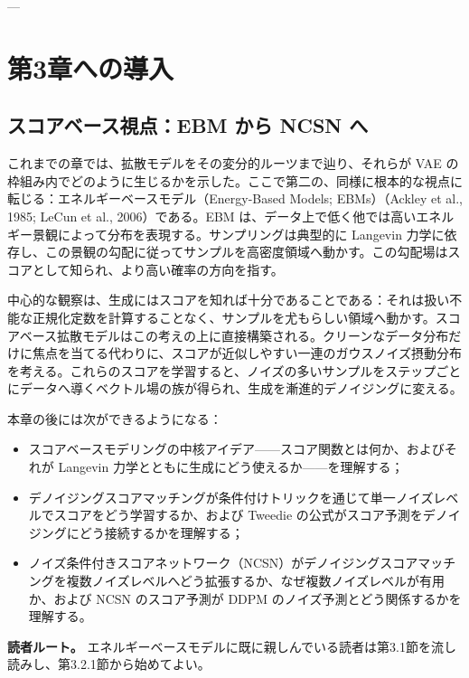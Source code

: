 ---

\section*{第3章への導入}


\subsection*{スコアベース視点：EBM から NCSN へ}


これまでの章では、拡散モデルをその変分的ルーツまで辿り、それらが VAE の枠組み内でどのように生じるかを示した。ここで第二の、同様に根本的な視点に転じる：エネルギーベースモデル（Energy-Based Models; EBMs）（Ackley et al., 1985; LeCun et al., 2006）である。EBM は、データ上で低く他では高いエネルギー景観によって分布を表現する。サンプリングは典型的に Langevin 力学に依存し、この景観の勾配に従ってサンプルを高密度領域へ動かす。この勾配場はスコアとして知られ、より高い確率の方向を指す。

中心的な観察は、生成にはスコアを知れば十分であることである：それは扱い不能な正規化定数を計算することなく、サンプルを尤もらしい領域へ動かす。スコアベース拡散モデルはこの考えの上に直接構築される。クリーンなデータ分布だけに焦点を当てる代わりに、スコアが近似しやすい一連のガウスノイズ摂動分布を考える。これらのスコアを学習すると、ノイズの多いサンプルをステップごとにデータへ導くベクトル場の族が得られ、生成を漸進的デノイジングに変える。

本章の後には次ができるようになる：

\begin{itemize}
\item スコアベースモデリングの中核アイデア——スコア関数とは何か、およびそれが Langevin 力学とともに生成にどう使えるか——を理解する；
\item デノイジングスコアマッチングが条件付けトリックを通じて単一ノイズレベルでスコアをどう学習するか、および Tweedie の公式がスコア予測をデノイジングにどう接続するかを理解する；
\item ノイズ条件付きスコアネットワーク（NCSN）がデノイジングスコアマッチングを複数ノイズレベルへどう拡張するか、なぜ複数ノイズレベルが有用か、および NCSN のスコア予測が DDPM のノイズ予測とどう関係するかを理解する。
\end{itemize}


\textbf{読者ルート。} エネルギーベースモデルに既に親しんでいる読者は第3.1節を流し読みし、第3.2.1節から始めてよい。

